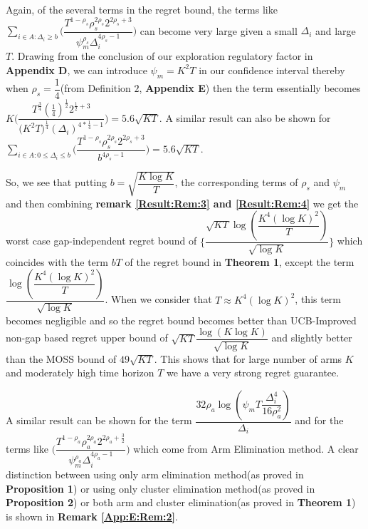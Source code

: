 \begin{remark}
\label{Result:Rem:4}
Again, of the several terms in the regret bound, the terms like  $\sum_{i\in A:\Delta_{i}\geq b}\bigg(\dfrac{T^{1-\rho_{s}}\rho_{s}^{2\rho_{s}}2^{2\rho_{s}+3}}{\psi_{m}^{\rho_{s}}\Delta_{i}^{4\rho_{s}-1}} \bigg)$ can become very large given a small $\Delta_{i}$ and large $T$. Drawing from the conclusion of our exploration regulatory factor in \textbf{Appendix D}, we can introduce $\psi_{m}=K^{2}T$ in our confidence interval thereby when $\rho_{s}=\dfrac{1}{4}$(from Definition $2$, \textbf{Appendix E}) then the term essentially becomes $K\bigg(\dfrac{T^{\frac{3}{4}}(\frac{1}{4})^{\frac{1}{2}}2^{\frac{1}{2}+3}}{{(K^{2}T})^{\frac{1}{4}}{(\Delta_{i})^{4*\frac{1}{4}-1}}} \bigg) = 5.6\sqrt{KT}$. A similar result can also be shown for $\sum_{i\in A:0\leq\Delta_{i}\leq b}\bigg(\dfrac{T^{1-\rho_{s}}\rho_{s}^{2\rho_{s}}2^{2\rho_{s}+3}}{b^{4\rho_{s} -1}} \bigg)=5.6\sqrt{KT}$. 
\end{remark}

\begin{remark}
\label{Result:Rem:5}
So, we see that putting $b=\sqrt{\dfrac{K\log K}{T}}$, the corresponding terms of $\rho_{s}$ and $\psi_{m}$ and then combining \textbf{remark \ref{Result:Rem:3} and \ref{Result:Rem:4}} we get the worst case gap-independent regret bound of $\bigg\lbrace \dfrac{\sqrt{KT}\log{(\dfrac{K^{4}(\log K)^{2}}{T})}}{\sqrt{\log K}}\bigg\rbrace$ which coincides with the term $bT$ of the regret bound in \textbf{Theorem 1}, except the term  $\dfrac{\log{(\dfrac{K^{4}(\log K)^{2}}{T})}}{\sqrt{\log K}}$. When we consider that $T\approx K^{4}(\log K)^{2}$, this term becomes negligible and so the regret bound becomes better than UCB-Improved non-gap based regret upper bound of $\sqrt{KT}\dfrac{\log(K\log K)}{\sqrt{\log K}}$ and slightly better than the MOSS bound of $49\sqrt{KT}$. This shows that for large number of arms $K$ and moderately high time horizon $T$ we have a very strong regret guarantee.
\end{remark}

\begin{remark}
\label{Result:Rem:6}
A similar result can be shown for the term $\dfrac{32\rho_{a}\log{(\psi_{m}T\dfrac{\Delta_{i}^{4}}{16\rho_{a}^{2}})}}{\Delta_{i}}$ and for the terms like $\bigg(\dfrac{T^{1-\rho_{a}}\rho_{a}^{2\rho_{a}}2^{2\rho_{a}+\frac{3}{2}}}{\psi_{m}^{\rho_{a}}\Delta_{i}^{4\rho_{a}-1}} \bigg)$ which come from Arm Elimination method. A clear distinction between using only arm elimination method(as proved in \textbf{Proposition 1}) or using only cluster elimination method(as proved in \textbf{Proposition 2}) or both arm and cluster elimination(as proved in \textbf{Theorem 1}) is shown in \textbf{Remark \ref{App:E:Rem:2}}.
\end{remark}

